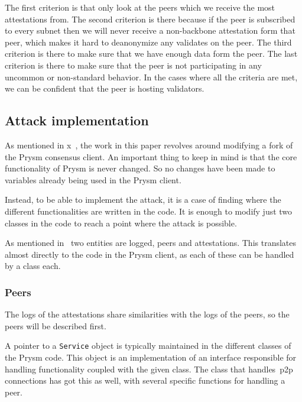 The first criterion is that only look at the peers which we receive the most attestations from.
The second criterion is there because if the peer is subscribed to every subnet then we will never receive a non-backbone attestation form that peer, which makes it hard to deanonymize any validates on the peer.
The third criterion is there to make sure that we have enough data form the peer.
The last criterion is there to make sure that the peer is not participating in any uncommon or non-standard behavior.
In the cases where all the criteria are met, we can be confident that the peer is hosting validators.


\subsection{Attack implementation}\label{subsec:attack-implementation}
As mentioned in x~,
the work in this paper revolves around modifying a fork of the Prysm consensus client.
An important thing to keep in mind is that the core functionality of Prysm is never changed.
So no changes have been made to variables already being used in the Prysm client.

Instead, to be able to implement the attack,
it is a case of finding where the different functionalities are written in the code.
It is enough to modify just two classes in the code to reach a point where the attack is possible.

As mentioned in~ two entities are logged, peers and attestations.
This translates almost directly to the code in the Prysm client, as each of these can be handled by a class each. 

\subsubsection{Peers}\label{subsubsec:peers}
The logs of the attestations share similarities with the logs of the peers, so the peers will be described first.

A pointer to a \texttt{Service} object is typically maintained in the different classes of the Prysm code.
This object is an implementation of an interface responsible for handling functionality coupled with the given class.
The class that handles~\gls{p2p} connections has got this as well, with several specific functions for handling a peer.

